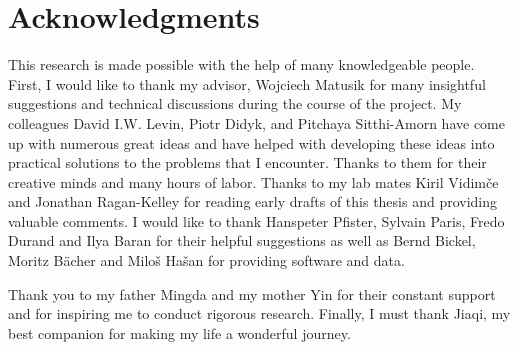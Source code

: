 
\chapter*{Acknowledgments}
\label{chap:ack}

This research is made possible with the help of many knowledgeable people.
First, I would like to thank my advisor, Wojciech Matusik for many insightful suggestions and technical discussions
during the course of the project.
My colleagues David I.W. Levin, Piotr Didyk, and Pitchaya Sitthi-Amorn have come up
with numerous great ideas and 
have helped with developing these ideas into practical solutions to the problems that I encounter.
Thanks to them for their creative minds and many hours of labor.
Thanks to my lab mates Kiril Vidim\v{c}e and Jonathan Ragan-Kelley for reading early drafts of this thesis and
providing valuable comments.
I would like to thank Hanspeter Pfister, Sylvain Paris, Fredo Durand and Ilya Baran for their helpful suggestions as well as Bernd Bickel, Moritz B\"{a}cher and  Milo\v{s} Ha\v{s}an for providing software and data.

Thank you to my father Mingda and my mother Yin for their constant support
and for inspiring me to conduct rigorous research.
Finally, I must thank Jiaqi, my best companion for making my life a wonderful journey.